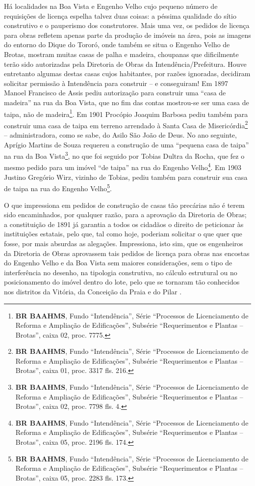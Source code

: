 Há localidades na Boa Vista e Engenho Velho cujo pequeno número de requisições de licença espelha talvez duas coisas: a péssima qualidade do sítio construtivo e o pauperismo dos construtores. Mais uma vez, os pedidos de licença para obras refletem apenas parte da produção de imóveis na área, pois as imagens do entorno do Dique do Tororó, onde também se situa o Engenho Velho de Brotas, mostram muitas casas de palha e madeira, choupanas que dificilmente terão sido autorizadas pela Diretoria de Obras da Intendência/Prefeitura. Houve entretanto algumas destas casas cujos habitantes, por razões ignoradas, decidiram solicitar permissão à Intendência para construir -- e conseguiram! Em 1897 Manoel Francisco de Assis pediu autorização para construir uma ``casa de madeira'' na rua da Boa Vista, que no fim das contas mostrou-se ser uma casa de taipa, não de madeira\footnote{\textbf{BR BAAHMS}, Fundo ``Intendência'', Série ``Processos de Licenciamento de Reforma e Ampliação de Edificações'', Subsérie ``Requerimentos e Plantas -- Brotas'', caixa 02, proc. 7775.}. Em 1901 Procópio Joaquim Barbosa pediu também para construir uma casa de taipa em terreno arrendado à Santa Casa de Misericórdia\footnote{\textbf{BR BAAHMS}, Fundo ``Intendência'', Série ``Processos de Licenciamento de Reforma e Ampliação de Edificações'', Subsérie ``Requerimentos e Plantas -- Brotas'', caixa 01, proc. 3317 fls. 216.} -- administradora, como se sabe, do Asilo São João de Deus. No ano seguinte, Aprígio Martins de Souza requereu a construção de uma ``pequena casa de taipa'' na rua da Boa Vista\footnote{\textbf{BR BAAHMS}, Fundo ``Intendência'', Série ``Processos de Licenciamento de Reforma e Ampliação de Edificações'', Subsérie ``Requerimentos e Plantas -- Brotas'', caixa 02, proc. 7798 fls. 4.}, no que foi seguido por Tobias Dultra da Rocha, que fez o mesmo pedido para um imóvel ``de taipa'' na rua do Engenho Velho\footnote{\textbf{BR BAAHMS}, Fundo ``Intendência'', Série ``Processos de Licenciamento de Reforma e Ampliação de Edificações'', Subsérie ``Requerimentos e Plantas -- Brotas'', caixa 05, proc. 2196 fls. 174.}. Em 1903 Justino Gregório Wirz, vizinho de Tobias, pediu também para construir sua casa de taipa na rua do Engenho Velho\footnote{\textbf{BR BAAHMS}, Fundo ``Intendência'', Série ``Processos de Licenciamento de Reforma e Ampliação de Edificações'', Subsérie ``Requerimentos e Plantas -- Brotas'', caixa 05, proc. 2283 fls. 173.}. 

O que impressiona em pedidos de construção de casas tão precárias não é terem sido encaminhados, por qualquer razão, para a aprovação da Diretoria de Obras; a constituição de 1891 já garantia a todos os cidadãos o direito de peticionar às instituições estatais, pelo que, tal como hoje, poderiam solicitar o que quer que fosse, por mais absurdas as alegações. Impressiona, isto sim, que os engenheiros da Diretoria de Obras aprovassem tais pedidos de licença para obras nas encostas do Engenho Velho e da Boa Vista sem maiores considerações, sem o tipo de interferência no desenho, na tipologia construtiva, no cálculo estrutural ou no posicionamento do imóvel dentro do lote, pelo que se tornaram tão conhecidos nos distritos da Vitória, da Conceição da Praia e do Pilar \cite{almeida_victoria_1997,almeida_vitrinescomercio_2014}. 

